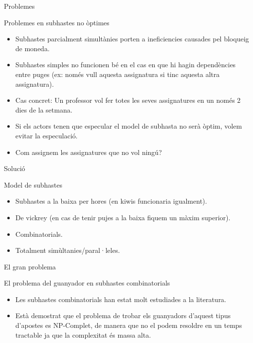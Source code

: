 \documentclass[twocolumn]{beamer}
\begin{document}
\begin{frame}{Problemes}
\begin{block}{Problemes en subhastes no òptimes}
	\begin{itemize}
		\item Subhastes parcialment simultànies porten a ineficiencies causades pel bloqueig de moneda.
		\item Subhastes simples no funcionen bé en el cas en que hi hagin dependències entre puges (ex: només vull aquesta assignatura si tinc aquesta altra assignatura).	
		\item Cas concret: Un professor vol fer totes les seves assignatures en un només 2 dies de la setmana.
		\item Si els actors tenen que especular el model de subhasta no serà òptim, volem evitar la especulació.
		\item Com assignem les assignatures que no vol ningú?
	\end{itemize}
\end{block}
\end{frame}

\begin{frame}{Solució}
\begin{block}{Model de subhastes}
	\begin{itemize}
		\item Subhastes a la baixa per hores (en kiwis funcionaria igualment).
		\item De vickrey (en cas de tenir pujes a la baixa fiquem un màxim superior).
		\item Combinatorials.
		\item Totalment simùltanies/paral·leles.
	\end{itemize}
\end{block}
\end{frame}

\begin{frame}{El gran problema}
\begin{block}{El problema del guanyador en subhastes combinatorials}
	\begin{itemize}
		\item Les subhastes combinatorials han estat molt estudiades a la literatura.
		\item Està demostrat que el problema de trobar els guanyadors d'aquest tipus d'apostes es NP-Complet, de manera que no el podem resoldre en un temps tractable ja que la complexitat és massa alta.
	\end{itemize}
\end{block}
\end{frame}
\end{document}
